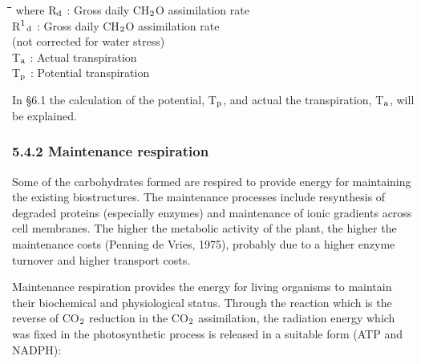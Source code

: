 \documentclass[11pt]{article}
\begin{document}
\nwln
\begin{tabbing}
\hspace{1.27cm}\=\hspace{1.27cm}\=\hspace{1.27cm}\=\hspace{1.27cm}\=%
\hspace{1.27cm}\=\hspace{1.27cm}\=\hspace{1.27cm}\=\hspace{1.27cm}\=%
\hspace{1.27cm}\=\hspace{1.27cm}\=\kill
where\> R$_{{\rm d}}$\> : Gross daily CH$_{{\rm 2}}$O assimilation rate\> \> \> \> \> \> \> \> [kg ha$^{{\rm -1}}$ d$^{{\rm -1}}$]\\
\>R$^{{\rm 1}}$$_{{\rm d}}$\> : Gross daily CH$_{{\rm 2}}$O assimilation rate\\
\>\>   (not corrected for water stress)\> \> \> \> \> \> \> \> [kg ha$^{{\rm -1}}$ d$^{{\rm -1}}$]\\
\>T$_{{\rm a}}$\> : Actual transpiration\> \> \> \> \> \> \> \> [cm d$^{{\rm -1}}$]\\
\>T$_{{\rm p}}$\> : Potential transpiration\> \> \> \> \> \> \> \> [cm d$^{{\rm -1}}$]
\end{tabbing}

 \bigskip
In \S 6.1 the calculation of the potential, T$_{{\rm p}}$, and actual the transpiration, T$_{{\rm a}}$, will be ex\-plained.

\bigskip
\bigskip

\subsubsection{  5.4.2 Maintenance respiration  }

Some of the carbohydrates formed are respired to provide energy for maintaining the
existing biostructures. The maintenance processes include resynthesis of degraded proteins
(especially enzymes) and maintenance of ionic gradients across cell mem\-branes. The
higher the metabolic activity of the plant, the higher the mainte\-nance costs (Penning de
Vries, 1975), probably due to a higher enzyme turnover and higher transport costs.

Maintenance respiration provides the energy for living organisms to maintain their
biochemical and physiological status. Through the reaction which is the reverse of CO$_{{\rm 2}}$
reduction in the CO$_{{\rm 2}}$ assimila\-tion, the radiation energy which was fixed in the photosyn\-thetic process is released in a suitable form (ATP and NADPH):
\end{document}
